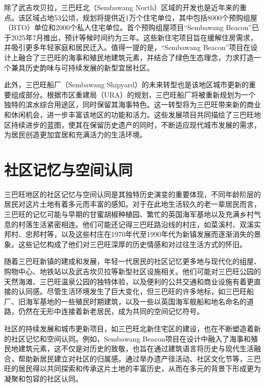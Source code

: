 \documentclass[11pt,a4paper,twoside,openany]{book}
\begin{document}
除了武吉坎贝拉，三巴旺北（Sembawang North）区域的开发也是近年来的重点。该区域占地53公顷，规划将提供近1万个住宅单位，其中包括8000个预购组屋（BTO）单位和2000个私人住宅单位。首个预购组屋项目“Sembawang Beacon”已于2025年7月推出，预计等候时间约为三年。这些新住宅项目旨在缓解住房需求，并吸引更多年轻家庭和居民迁入。值得一提的是，“Sembawang Beacon”项目在设计上融合了三巴旺的海事和殖民地建筑元素，并结合了绿色生态理念，力求打造一个兼具历史韵味与可持续发展的新型宜居社区。

此外，三巴旺船厂（Sembawang Shipyard）的未来转型也是该地区城市更新的重要组成部分。根据市区重建局（URA）的规划，三巴旺船厂将被重新规划为一个独特的滨水综合用途区，同时保留其海事特色。这一转型将为三巴旺带来新的商业和休闲机会，进一步丰富该地区的功能和活力。这些发展项目共同描绘了三巴旺地区持续进步的蓝图，使其在保留历史遗产的同时，不断适应现代城市发展的需求，为居民创造更加宜居和充满活力的生活环境。

\section{社区记忆与空间认同}
三巴旺地区的社区记忆与空间认同是其独特历史演变的重要体现，不同年龄阶层的居民对这片土地有着多元而丰富的感知。对于在此地生活较久的老一辈居民而言，三巴旺的记忆可能与早期的甘蜜胡椒种植园、繁忙的英国海军基地以及充满乡村气息的村落生活紧密相连。他们可能还记得三巴旺路沿线的村庄，如菜溪村、双溪实邦村、忠邦村等，以及这些村庄在1970年代至1990年代为新镇发展而逐渐消失的景象。这些记忆构成了他们对三巴旺深厚的历史情感和对过往生活方式的怀旧。

随着三巴旺新镇的建成和发展，年轻一代居民的社区记忆更多地与现代化的组屋、购物中心、地铁站以及武吉坎贝拉等新型社区设施相关。他们可能对三巴旺公园的天然海滩、三巴旺温泉公园的独特体验，以及便利的公共交通和商业设施有着更直接的认同感。尽管生活环境发生了巨大变化，但三巴旺的许多地标，如三巴旺船厂、旧海军基地的一些殖民时期建筑，以及一些以英国海军舰船和地名命名的道路，仍然在无形中连接着新老居民，成为共同的空间记忆符号。

社区的持续发展和城市更新项目，如三巴旺北新住宅区的建设，也在不断塑造着新的社区记忆和空间认同。例如，Sembawang Beacon项目在设计中融入了海事和殖民地建筑元素，这不仅是对历史的致敬，也旨在通过建筑语言将历史与现代生活融合，帮助新居民建立对社区的归属感。通过举办遗产径活动、社区文化节等，三巴旺的居民得以共同探索和传承这片土地的丰富历史，从而在多元的背景下形成更为凝聚和包容的社区认同。
\end{document}

